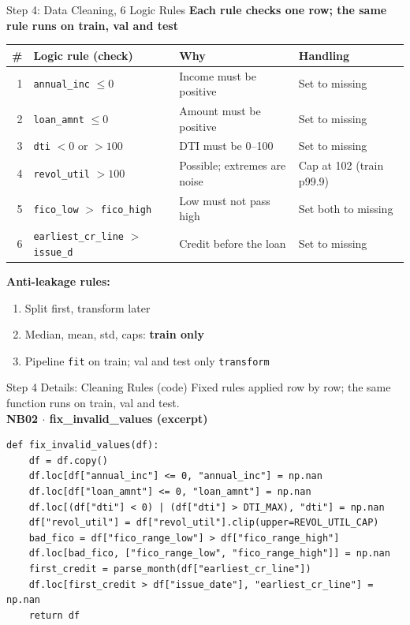 \documentclass{beamer}
\newcommand{\code}[1]{\texttt{\small #1}}
\begin{document}
\begin{frame}{Step 4: Data Cleaning, 6 Logic Rules}
    \textbf{Each rule checks one row; the same rule runs on train, val and test}
    \begin{table}
        \centering
        \scriptsize
        \begin{tabular}{rlll}
            \hline
            \textbf{\#} & \textbf{Logic rule (check)} & \textbf{Why} & \textbf{Handling} \\
            \hline
            1 & \code{annual\_inc} $\le 0$ & Income must be positive & Set to missing \\
            2 & \code{loan\_amnt} $\le 0$ & Amount must be positive & Set to missing \\
            3 & \code{dti} $<0$ or $>100$ & DTI must be 0--100 & Set to missing \\
            4 & \code{revol\_util} $>100$ & Possible; extremes are noise & Cap at 102 (train p99.9) \\
            5 & \code{fico\_low} $>$ \code{fico\_high} & Low must not pass high & Set both to missing \\
            6 & \code{earliest\_cr\_line} $>$ \code{issue\_d} & Credit before the loan & Set to missing \\
            \hline
        \end{tabular}
    \end{table}
    \textbf{Anti-leakage rules:}
    \begin{enumerate}
        \item Split first, transform later
        \item Median, mean, std, caps: \textbf{train only}
        \item Pipeline \code{fit} on train; val and test only \code{transform}
    \end{enumerate}
\end{frame}

\begin{frame}[fragile]{Step 4 Details: Cleaning Rules (code)}
  Fixed rules applied row by row; the same function runs on train, val and test.\\[0.1cm]
  \textbf{\scriptsize NB02 $\cdot$ fix\_invalid\_values (excerpt)}
\begin{lstlisting}
def fix_invalid_values(df):
    df = df.copy()
    df.loc[df["annual_inc"] <= 0, "annual_inc"] = np.nan
    df.loc[df["loan_amnt"] <= 0, "loan_amnt"] = np.nan
    df.loc[(df["dti"] < 0) | (df["dti"] > DTI_MAX), "dti"] = np.nan
    df["revol_util"] = df["revol_util"].clip(upper=REVOL_UTIL_CAP)
    bad_fico = df["fico_range_low"] > df["fico_range_high"]
    df.loc[bad_fico, ["fico_range_low", "fico_range_high"]] = np.nan
    first_credit = parse_month(df["earliest_cr_line"])
    df.loc[first_credit > df["issue_date"], "earliest_cr_line"] = np.nan
    return df
\end{lstlisting}
\end{frame}
\end{document}
